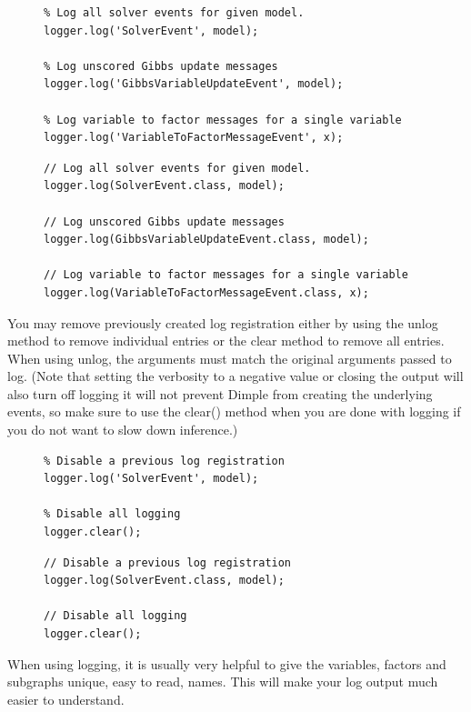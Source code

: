\begin{figure}[H]
\ifmatlab
\begin{lstlisting}
% Log all solver events for given model.
logger.log('SolverEvent', model);

% Log unscored Gibbs update messages
logger.log('GibbsVariableUpdateEvent', model);

% Log variable to factor messages for a single variable
logger.log('VariableToFactorMessageEvent', x);
\end{lstlisting}
\fi

\ifjava
\begin{lstlisting}
// Log all solver events for given model.
logger.log(SolverEvent.class, model);

// Log unscored Gibbs update messages
logger.log(GibbsVariableUpdateEvent.class, model);

// Log variable to factor messages for a single variable
logger.log(VariableToFactorMessageEvent.class, x);
\end{lstlisting}
\fi
\end{figure}

You may remove previously created log registration either by
using the unlog method to remove individual entries or the clear
method to remove all entries. When using unlog, the arguments must
match the original arguments passed to log. (Note that setting the verbosity to a negative value or closing the output will also turn off logging it will not prevent Dimple from creating the underlying events, so make sure to use the clear() method when you are done with logging if you do not want to slow down inference.)

\begin{figure}[H]
\ifmatlab
\begin{lstlisting}
% Disable a previous log registration
logger.log('SolverEvent', model);

% Disable all logging
logger.clear();
\end{lstlisting}
\fi

\ifjava
\begin{lstlisting}
// Disable a previous log registration
logger.log(SolverEvent.class, model);

// Disable all logging
logger.clear();
\end{lstlisting}
\fi
\end{figure}

When using logging, it is usually very helpful to give the variables, factors and
subgraphs unique, easy to read, names. This will make your log output much easier to understand.

